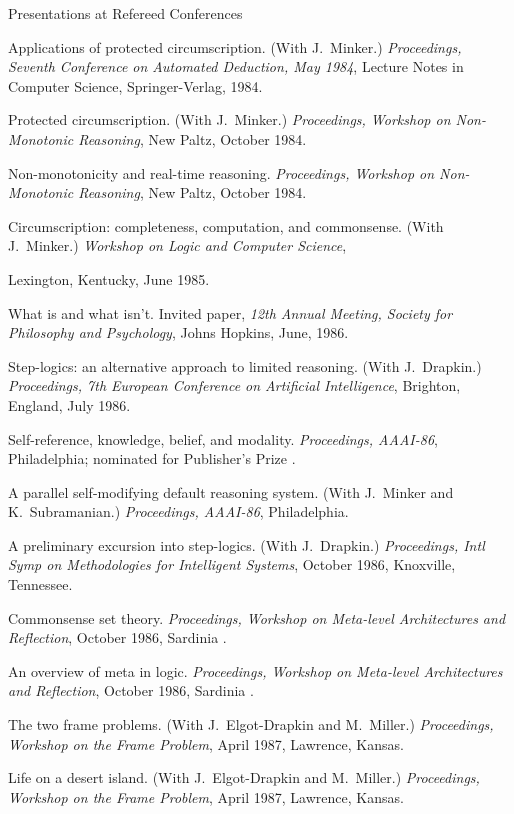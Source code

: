 \subsec Presentations at Refereed Conferences

\paper
Applications  of  protected  circumscription.
(With J.~Minker.)
{\sl Proceedings, Seventh Conference on Automated Deduction, May 1984},
Lecture Notes in Computer Science, Springer-Verlag, 1984.

\paper
Protected circumscription.
(With  J.~Minker.)
{\sl Proceedings, Workshop on Non-Monotonic Reasoning},
New Paltz, October 1984.

\paper
Non-monotonicity and real-time reasoning.
{\sl Proceedings, Workshop on Non-Monotonic Reasoning}, 
New Paltz, October 1984.

\paper
Circumscription: completeness, computation, and commonsense.
(With J.~Minker.)
{\sl Workshop on Logic and Computer Science},

Lexington, Kentucky, June 1985.

\paper
What is and what isn't.
Invited paper,
{\sl 12th Annual Meeting, Society for Philosophy and Psychology},
Johns Hopkins, June, 1986.

\paper
Step-logics: an alternative approach to limited reasoning.
(With J.~Drapkin.)
{\sl Proceedings, 7th European Conference on Artificial Intelligence},
Brighton, England, July 1986.

\paper
Self-reference, knowledge, belief, and modality.
{\sl Proceedings, AAAI-86},
Philadelphia; nominated for Publisher's Prize
.

\paper
A parallel self-modifying default reasoning system.
(With J.~Minker and K.~Subramanian.)
{\sl Proceedings, AAAI-86},
Philadelphia.

\paper
A preliminary excursion into step-logics.
(With J.~Drapkin.)
{\sl Proceedings, Intl Symp on Methodologies for Intelligent Systems},
October 1986, Knoxville, Tennessee.

\paper
Commonsense set theory.
{\sl Proceedings, Workshop on Meta-level Architectures and Reflection},
October 1986, Sardinia
.

\paper
An overview of meta in logic.
{\sl Proceedings, Workshop on Meta-level Architectures and Reflection},
October 1986, Sardinia
.

\paper
The two frame problems.
(With J.~Elgot-Drapkin and M.~Miller.)
{\sl Proceedings, Workshop on the Frame Problem},
April 1987, Lawrence, Kansas.

\paper
Life on a desert island.
(With J.~Elgot-Drapkin and M.~Miller.)
{\sl Proceedings, Workshop on the Frame Problem},
April 1987, Lawrence, Kansas.

